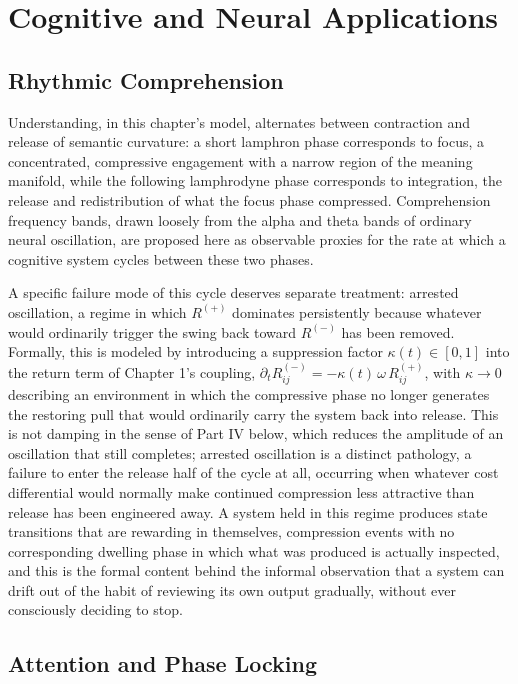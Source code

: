 \part{Cognitive and Neural Applications}

\chapter{Rhythmic Comprehension}

Understanding, in this chapter's model, alternates between contraction and release of semantic curvature: a short lamphron phase corresponds to focus, a concentrated, compressive engagement with a narrow region of the meaning manifold, while the following lamphrodyne phase corresponds to integration, the release and redistribution of what the focus phase compressed. Comprehension frequency bands, drawn loosely from the alpha and theta bands of ordinary neural oscillation, are proposed here as observable proxies for the rate at which a cognitive system cycles between these two phases.

A specific failure mode of this cycle deserves separate treatment: arrested oscillation, a regime in which $R^{(+)}$ dominates persistently because whatever would ordinarily trigger the swing back toward $R^{(-)}$ has been removed. Formally, this is modeled by introducing a suppression factor $\kappa(t) \in [0,1]$ into the return term of Chapter 1's coupling, $\partial_t R^{(-)}_{ij} = -\kappa(t)\, \omega\, R^{(+)}_{ij}$, with $\kappa \to 0$ describing an environment in which the compressive phase no longer generates the restoring pull that would ordinarily carry the system back into release. This is not damping in the sense of Part IV below, which reduces the amplitude of an oscillation that still completes; arrested oscillation is a distinct pathology, a failure to enter the release half of the cycle at all, occurring when whatever cost differential would normally make continued compression less attractive than release has been engineered away. A system held in this regime produces state transitions that are rewarding in themselves, compression events with no corresponding dwelling phase in which what was produced is actually inspected, and this is the formal content behind the informal observation that a system can drift out of the habit of reviewing its own output gradually, without ever consciously deciding to stop.

\chapter{Attention and Phase Locking}

